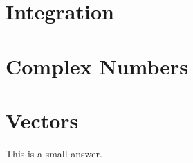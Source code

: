 \documentclass[11pt,fleqn,table]{book} %
\begin{document}
% 
% 


% 
% 



% 
% 

% 

% 
% 
% 
% 


\clearpage



		
\chapter{Integration}		



\clearpage



		
\chapter{Complex Numbers}		



\chapter{Vectors}		

\Kalam This is a small answer.





\vspace*{\fill}
\begin{flushright}
    \hfill
    \EANisbn[SC5b,ISBN=978-80-7340-097-2]
\end{flushright}
\end{document}
